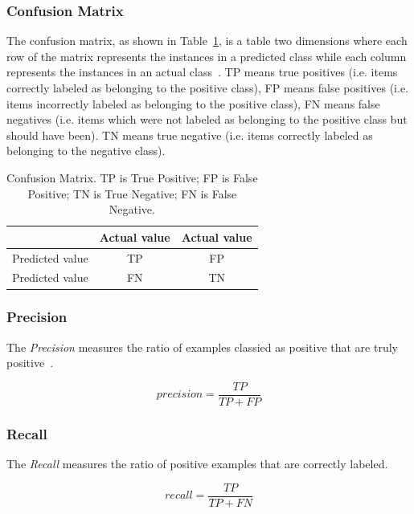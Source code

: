 \subsubsection{Confusion Matrix}
The confusion matrix,
as shown in Table~\ref{tb:confusion},
is a table two dimensions
where each row of the matrix represents the instances
in a predicted class while
each column represents the instances
in an actual class~\cite{powers2011evaluation}.
TP means true positives
(i.e. items correctly labeled as belonging to the positive
class),
FP means false positives
(i.e. items incorrectly labeled as belonging to the
positive class),
FN means false negatives
(i.e. items which were not labeled as
belonging to the positive class but should have been).
TN means true negative
(i.e. items correctly labeled as belonging to the negative
class).

\begin{table}  \centering
  \caption{Confusion Matrix.
  TP is True Positive;
  FP is False Positive;
  TN is True Negative;
  FN is False Negative. }
  \label{tb:confusion}
  \begin{tabular}{ccc}
  \toprule
    & Actual value   &  Actual value    \\
  \midrule
  Predicted value  & TP & FP  \\
  Predicted value    & FN & TN  \\
  \bottomrule
  \end{tabular}
\end{table}


\subsubsection{Precision}

The \textit{Precision} measures the ratio of
examples classied as positive that
are truly positive~\cite{ting2010precision}.

\begin{equation}
  precision=\frac{TP}{TP+FP}
\end{equation}

\subsubsection{Recall}
The \textit{Recall} measures the ratio of positive examples that
are correctly labeled.

\begin{equation}
  recall=\frac{TP}{TP+FN}
\end{equation}

